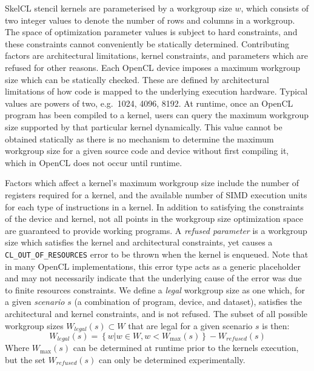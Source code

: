   SkelCL stencil kernels are parameterised by a workgroup size $w$,
  which consists of two integer values to denote the number of rows and
  columns in a workgroup. The space of optimization parameter values is
  subject to hard constraints, and these constraints cannot conveniently
  be statically determined. Contributing factors are architectural
  limitations, kernel constraints, and parameters which are refused for
  other reasons. Each OpenCL device imposes a maximum workgroup size
  which can be statically checked. These are defined by architectural
  limitations of how code is mapped to the underlying execution
  hardware. Typical values are powers of two, e.g.\ 1024, 4096, 8192. At
  runtime, once an OpenCL program has been compiled to a kernel, users
  can query the maximum workgroup size supported by that particular
  kernel dynamically. This value cannot be obtained statically as
  there is no mechanism to determine the maximum workgroup size for a
  given source code and device without first compiling it, which in
  OpenCL does not occur until runtime.

  Factors which affect a kernel's maximum workgroup size include the
  number of registers required for a kernel, and the available number of
  SIMD execution units for each type of instructions in a kernel. In
  addition to satisfying the constraints of the device and kernel, not
  all points in the workgroup size optimization space are guaranteed to
  provide working programs. A \emph{refused parameter} is a workgroup
  size which satisfies the kernel and architectural constraints, yet
  causes a \texttt{CL\_OUT\_OF\_RESOURCES} error to be thrown when the
  kernel is enqueued. Note that in many OpenCL implementations, this
  error type acts as a generic placeholder and may not necessarily
  indicate that the underlying cause of the error was due to finite
  resources constraints. We define a \emph{legal} workgroup size as one
  which, for a given \emph{scenario} $s$ (a combination of program,
  device, and dataset), satisfies the architectural and kernel
  constraints, and is not refused. The subset of all possible workgroup
  sizes $W_{legal}(s) \subset W$ that are legal for a given scenario $s$
  is then:
  \begin{equation}
    W_{legal}(s) = \left\{w | w \in W, w < W_{\max}(s) \right\} - W_{refused}(s)
  \end{equation}
  Where $W_{\max}(s)$ can be determined at runtime prior to the kernels
  execution, but the set $W_{refused}(s)$ can only be determined
  experimentally.

